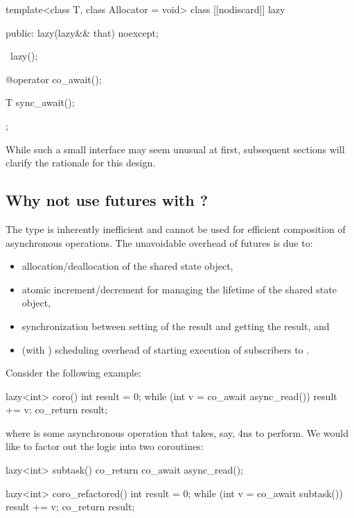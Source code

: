 \begin{codeblock}
template<class T, class Allocator = void>
class [[nodiscard]] lazy {
public:
  lazy(lazy&& that) noexcept;

  ~lazy();

  @\unspec@ operator co_await();

  T sync_await();
};
\end{codeblock}

While such a small interface may seem unusual at first,
subsequent sections will clarify the rationale for this design.

\subsection{Why not use futures with ?}

The  type is inherently inefficient and cannot be used for efficient composition of asynchronous operations.
The unavoidable overhead of futures is due to:
\begin{itemize}
\item allocation/deallocation of the shared state object,
\item atomic increment/decrement for managing the lifetime of the shared state object,
\item synchronization between setting of the result and getting the result, and
\item (with ) scheduling overhead of starting execution of subscribers to .
\end{itemize}

Consider the following example:
\begin{codeblock}
lazy<int> coro() {
  int result = 0;
  while (int v = co_await async_read())
    result += v;
  co_return result;
}
\end{codeblock}
where  is some asynchronous operation that takes, say, 4ns to perform.
We would like to factor out the logic into two coroutines:
\begin{codeblock}
lazy<int> subtask() {
  co_return co_await async_read();
}

lazy<int> coro_refactored() {
  int result = 0;
  while (int v = co_await subtask())
    result += v;
  co_return result;
}
\end{codeblock}

